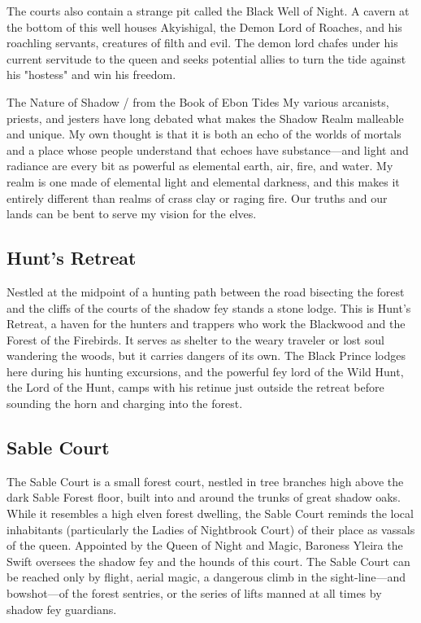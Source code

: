 \documentclass[10pt,a4paper,twoside,bg=print,twocolumn,openany,nodeprecatedcode]{dndbook}
\begin{document}
The courts also contain a strange pit called the Black Well of Night. A cavern at the bottom of this well houses Akyishigal, the Demon Lord of Roaches, and his roachling servants, creatures of filth and evil. The demon lord chafes under his current servitude to the queen and seeks potential allies to turn the tide against his "hostess" and win his freedom.

\begin{DndSidebar}[float=!b]{The Nature of Shadow / from the Book of Ebon Tides}
My various arcanists, priests, and jesters have long debated what makes the Shadow Realm malleable and unique. My own thought is that it is both an echo of the worlds of mortals and a place whose people understand that echoes have substance—and light and radiance are every bit as powerful as elemental earth, air, fire, and water. My realm is one made of elemental light and elemental darkness, and this makes it entirely different than realms of crass clay or raging fire. Our truths and our lands can be bent to serve my vision for the elves.



\end{DndSidebar}

\subsection{Hunt's Retreat}
Nestled at the midpoint of a hunting path between the road bisecting the forest and the cliffs of the courts of the shadow fey stands a stone lodge. This is Hunt's Retreat, a haven for the hunters and trappers who work the Blackwood and the Forest of the Firebirds. It serves as shelter to the weary traveler or lost soul wandering the woods, but it carries dangers of its own. The Black Prince lodges here during his hunting excursions, and the powerful fey lord of the Wild Hunt, the Lord of the Hunt, camps with his retinue just outside the retreat before sounding the horn and charging into the forest.

\subsection{Sable Court}
The Sable Court is a small forest court, nestled in tree branches high above the dark Sable Forest floor, built into and around the trunks of great shadow oaks. While it resembles a high elven forest dwelling, the Sable Court reminds the local inhabitants (particularly the Ladies of Nightbrook Court) of their place as vassals of the queen. Appointed by the Queen of Night and Magic, Baroness Yleira the Swift oversees the shadow fey and the hounds of this court. The Sable Court can be reached only by flight, aerial magic, a dangerous climb in the sight-line—and bowshot—of the forest sentries, or the series of lifts manned at all times by shadow fey guardians.
\end{document}
